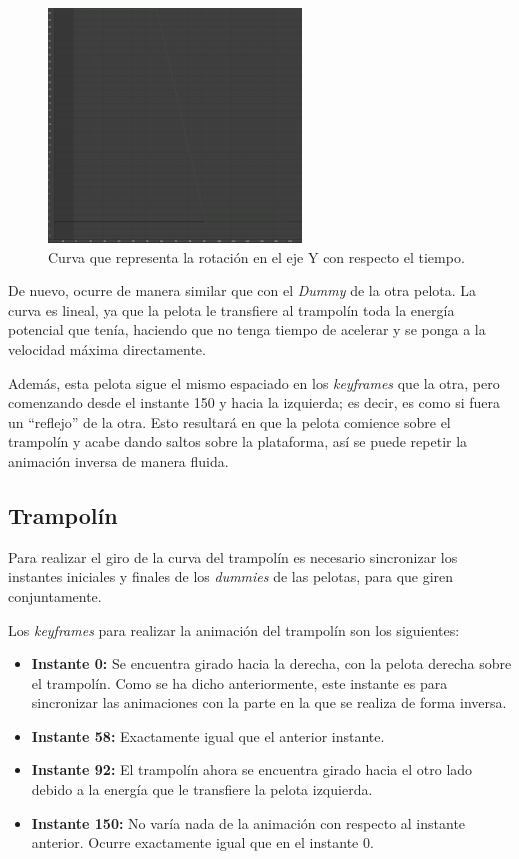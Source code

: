 \documentclass{article}
\begin{document}
\begin{figure}[H]
    \centering
    \includegraphics[width=0.6\textwidth]{imagenes/curvas/PR/dummy/green.png}
    \caption{Curva que representa la rotación en el eje Y con respecto el tiempo.}
 \end{figure}

De nuevo, ocurre de manera similar que con el \textit{Dummy} de la otra pelota. La curva es lineal, ya que la pelota le transfiere al trampolín toda la energía potencial que tenía, haciendo que no tenga tiempo de acelerar y se ponga a la velocidad máxima directamente.

\bigskip

Además, esta pelota sigue el mismo espaciado en los \textit{keyframes} que la otra, pero comenzando desde el instante 150 y hacia la izquierda; es decir, es como si fuera un ``reflejo'' de la otra. Esto resultará en que la pelota comience sobre el trampolín y acabe dando saltos sobre la plataforma, así se puede repetir la animación inversa de manera fluida.

\newpage
\subsection{Trampolín}
Para realizar el giro de la curva del trampolín es necesario sincronizar los instantes iniciales y finales de los \textit{dummies} de las pelotas, para que giren conjuntamente.

\bigskip

Los \textit{keyframes} para realizar la animación del trampolín son los siguientes:

\begin{itemize}
    \item \textbf{Instante 0: }Se encuentra girado hacia la derecha, con la pelota derecha sobre el trampolín. Como se ha dicho anteriormente, este instante es para sincronizar las animaciones con la parte en la que se realiza de forma inversa.
    \item \textbf{Instante 58: }Exactamente igual que el anterior instante.
    \item \textbf{Instante 92: }El trampolín ahora se encuentra girado hacia el otro lado debido a la energía que le transfiere la pelota izquierda.
    \item \textbf{Instante 150: }No varía nada de la animación con respecto al instante anterior. Ocurre exactamente igual que en el instante 0.
\end{itemize}
\end{document}
